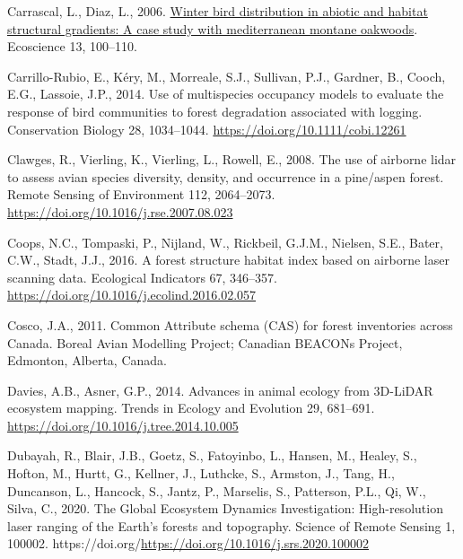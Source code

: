 \documentclass[
]{article}
\newlength{\cslhangindent}
\newlength{\cslentryspacingunit} %
\newenvironment{CSLReferences}[2] %
 {%
  \setlength{\parindent}{0pt}
  \ifodd #1
  \let\oldpar\par
  \def\par{\hangindent=\cslhangindent\oldpar}
  \fi
  \setlength{\parskip}{#2\cslentryspacingunit}
 }%
 {}
\begin{document}
\begin{CSLReferences}{1}{0}
\leavevmode{}%
Carrascal, L., Diaz, L., 2006. \href{https://www.tandfonline.com/doi/abs/10.2980/1195-6860(2006)13\%5B100\%3AWBDIAA\%5D2.0.CO\%3B2}{Winter bird distribution in abiotic and habitat structural gradients: A case study with mediterranean montane oakwoods}. Ecoscience 13, 100--110.

\leavevmode{}%
Carrillo-Rubio, E., Kéry, M., Morreale, S.J., Sullivan, P.J., Gardner, B., Cooch, E.G., Lassoie, J.P., 2014. Use of multispecies occupancy models to evaluate the response of bird communities to forest degradation associated with logging. Conservation Biology 28, 1034--1044. \url{https://doi.org/10.1111/cobi.12261}

\leavevmode{}%
Clawges, R., Vierling, K., Vierling, L., Rowell, E., 2008. The use of airborne lidar to assess avian species diversity, density, and occurrence in a pine/aspen forest. Remote Sensing of Environment 112, 2064--2073. \url{https://doi.org/10.1016/j.rse.2007.08.023}

\leavevmode{}%
Coops, N.C., Tompaski, P., Nijland, W., Rickbeil, G.J.M., Nielsen, S.E., Bater, C.W., Stadt, J.J., 2016. A forest structure habitat index based on airborne laser scanning data. Ecological Indicators 67, 346--357. \url{https://doi.org/10.1016/j.ecolind.2016.02.057}

\leavevmode{}%
Cosco, J.A., 2011. Common {Attribute} schema ({CAS}) for forest inventories across {Canada}. Boreal Avian Modelling Project; Canadian BEACONs Project, Edmonton, Alberta, Canada.

\leavevmode{}%
Davies, A.B., Asner, G.P., 2014. Advances in animal ecology from {3D}-{LiDAR} ecosystem mapping. Trends in Ecology and Evolution 29, 681--691. \url{https://doi.org/10.1016/j.tree.2014.10.005}

\leavevmode{}%
Dubayah, R., Blair, J.B., Goetz, S., Fatoyinbo, L., Hansen, M., Healey, S., Hofton, M., Hurtt, G., Kellner, J., Luthcke, S., Armston, J., Tang, H., Duncanson, L., Hancock, S., Jantz, P., Marselis, S., Patterson, P.L., Qi, W., Silva, C., 2020. The {Global} {Ecosystem} {Dynamics} {Investigation}: {High}-resolution laser ranging of the {Earth}'s forests and topography. Science of Remote Sensing 1, 100002. https://doi.org/\url{https://doi.org/10.1016/j.srs.2020.100002}


\end{CSLReferences}
\end{document}
